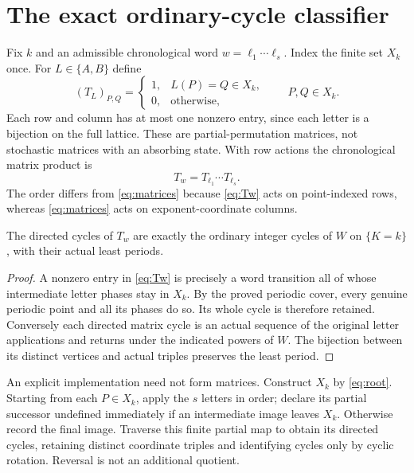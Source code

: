 \section{The exact ordinary-cycle classifier}\label{sec:classifier}

Fix $k$ and an admissible chronological word $w=\ell_1\cdots\ell_s$.
Index the finite set $X_k$ once. For $L\in\{A,B\}$ define
\begin{equation}\label{eq:partial}
 (T_L)_{P,Q}=
 \begin{cases}
 1,&L(P)=Q\in X_k,\\
 0,&\text{otherwise},
 \end{cases}
 \qquad P,Q\in X_k.
\end{equation}
Each row and column has at most one nonzero entry, since each
letter is a bijection on the full lattice. These are
partial-permutation matrices, not stochastic matrices with an
absorbing state. With row actions the chronological matrix
product is
\begin{equation}\label{eq:Tw}
 T_w=T_{\ell_1}\cdots T_{\ell_s}.
\end{equation}
The order differs from \eqref{eq:matrices} because
\eqref{eq:Tw} acts on point-indexed rows, whereas
\eqref{eq:matrices} acts on exponent-coordinate columns.

\begin{proposition}\label{prop:classifier}
The directed cycles of $T_w$ are exactly the ordinary integer
cycles of $W$ on $\{K=k\}$, with their actual least periods.
\end{proposition}

\begin{proof}
A nonzero entry in \eqref{eq:Tw} is precisely a word
transition all of whose intermediate letter phases stay
in $X_k$. By the proved periodic cover, every genuine
periodic point and all its phases do so. Its whole cycle
is therefore retained. Conversely each directed matrix
cycle is an actual sequence of the original letter
applications and returns under the indicated powers
of $W$. The bijection between its distinct vertices
and actual triples preserves the least period.
\end{proof}

An explicit implementation need not form matrices. Construct
$X_k$ by \eqref{eq:root}. Starting from each $P\in X_k$, apply
the $s$ letters in order; declare its partial successor
undefined immediately if an intermediate image leaves $X_k$.
Otherwise record the final image. Traverse this finite
partial map to obtain its directed cycles, retaining distinct
coordinate triples and identifying cycles only by cyclic
rotation. Reversal is not an additional quotient.

